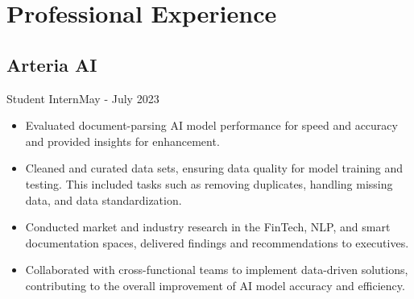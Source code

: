 \section{Professional Experience}
\subsection{Arteria AI}{Student Intern}{May - July 2023}
\begin{itemize}
    \item Evaluated document-parsing AI model performance for speed and accuracy and provided insights for enhancement.  
    \item Cleaned and curated data sets, ensuring data quality for model training and testing. This included tasks such as removing duplicates, handling missing data, and data standardization.
    \item Conducted market and industry research in the FinTech, NLP, and smart documentation spaces, delivered findings and recommendations to executives. 
    \item Collaborated with cross-functional teams to implement data-driven solutions, contributing to the overall improvement of AI model accuracy and efficiency.
\end{itemize}

